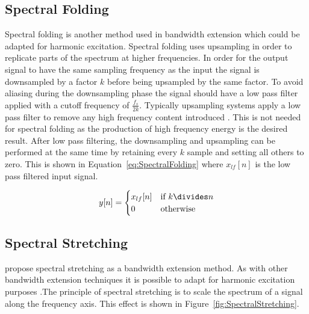	\subsection{Spectral Folding}
	\label{sec:Excitation-Methods-SpectralFolding}
		Spectral folding is another method used in bandwidth extension \citep{friedrich2007spectral} which could be
		adapted for harmonic excitation. Spectral folding uses upsampling in order to replicate parts of the
		spectrum at higher frequencies. In order for the output signal to have the same sampling frequency as the
		input the signal is downsampled by a factor $k$ before being upsampled by the same factor. To avoid
		aliasing during the downsampling phase the signal should have a low pass filter applied with a cutoff
		frequency of $\frac{f_{s}}{2k}$. Typically upsampling systems apply a low pass filter to remove any high
		frequency content introduced \citep{oppenheim2014discrete}. This is not needed for spectral folding as the
		production of high frequency energy is the desired result. After low pass filtering, the downsampling and
		upsampling can be performed at the same time by retaining every $k$ sample and setting all others
		to zero. This is shown in Equation~\ref{eq:SpectralFolding} where $x_{lf}[n]$ is the low pass filtered
		input signal.

		\begin{equation}
			y[n] = \begin{cases}
				x_{lf}[n] & \text{if $k \divides n$} \\
				0 & \text{otherwise}
			\end{cases}
			\label{eq:SpectralFolding}
		\end{equation}

	\subsection{Spectral Stretching}
	\label{sec:Excitation-Methods-SpectralStretching}
		\citet{nagel2009a} propose spectral stretching as a bandwidth extension method. As with other bandwidth
		extension techniques it is possible to adapt for harmonic excitation purposes .The principle of spectral
		stretching is to scale the spectrum of a signal along the frequency axis. This effect is shown in
		Figure~\ref{fig:SpectralStretching}.


